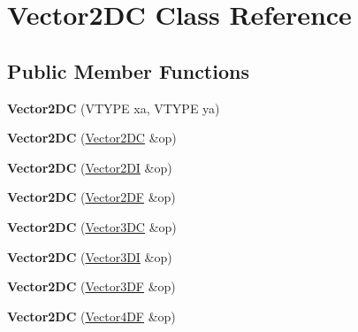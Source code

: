 \hypertarget{class_vector2_d_c}{\section{Vector2\+D\+C Class Reference}
\label{class_vector2_d_c}
}
\subsection*{Public Member Functions}
\begin{DoxyCompactItemize}
\item 
\hypertarget{class_vector2_d_c_acf7a3f8387c02335123c3371d9af25ae}{{\bfseries Vector2\+D\+C} (V\+T\+Y\+P\+E xa, V\+T\+Y\+P\+E ya)}\label{class_vector2_d_c_acf7a3f8387c02335123c3371d9af25ae}

\item 
\hypertarget{class_vector2_d_c_aa6bf03c3156444737d9f9c61308b359f}{{\bfseries Vector2\+D\+C} (\hyperlink{class_vector2_d_c}{Vector2\+D\+C} \&op)}\label{class_vector2_d_c_aa6bf03c3156444737d9f9c61308b359f}

\item 
\hypertarget{class_vector2_d_c_a4b5303cd1ed49ab92d4fd5e6d5534460}{{\bfseries Vector2\+D\+C} (\hyperlink{class_vector2_d_i}{Vector2\+D\+I} \&op)}\label{class_vector2_d_c_a4b5303cd1ed49ab92d4fd5e6d5534460}

\item 
\hypertarget{class_vector2_d_c_afbd42ea30b44132c9469bf286f39f8ef}{{\bfseries Vector2\+D\+C} (\hyperlink{class_vector2_d_f}{Vector2\+D\+F} \&op)}\label{class_vector2_d_c_afbd42ea30b44132c9469bf286f39f8ef}

\item 
\hypertarget{class_vector2_d_c_af3eac8cb298e1e367143972f17753e20}{{\bfseries Vector2\+D\+C} (\hyperlink{class_vector3_d_c}{Vector3\+D\+C} \&op)}\label{class_vector2_d_c_af3eac8cb298e1e367143972f17753e20}

\item 
\hypertarget{class_vector2_d_c_a08fabbd984903ce255d14faba04a2a12}{{\bfseries Vector2\+D\+C} (\hyperlink{class_vector3_d_i}{Vector3\+D\+I} \&op)}\label{class_vector2_d_c_a08fabbd984903ce255d14faba04a2a12}

\item 
\hypertarget{class_vector2_d_c_a3188a7f0d9e546d41bc697373b96d003}{{\bfseries Vector2\+D\+C} (\hyperlink{class_vector3_d_f}{Vector3\+D\+F} \&op)}\label{class_vector2_d_c_a3188a7f0d9e546d41bc697373b96d003}

\item 
\hypertarget{class_vector2_d_c_a30f395dc9722d9f957551b1a726b143c}{{\bfseries Vector2\+D\+C} (\hyperlink{class_vector4_d_f}{Vector4\+D\+F} \&op)}\label{class_vector2_d_c_a30f395dc9722d9f957551b1a726b143c}


\end{DoxyCompactItemize}
